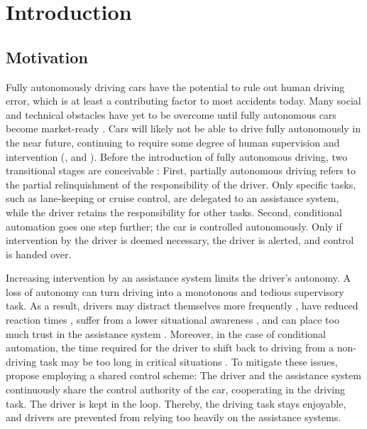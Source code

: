 \chapter{Introduction}
\label{sec:intro}

\section{Motivation}

Fully autonomously driving cars have the potential to rule out human driving error, which is at least a contributing factor to most accidents today. Many social and technical obstacles have yet to be overcome until fully autonomous cars become market-ready \parencite{autonomous_driving_book}. Cars will likely not be able to drive fully autonomously in the near future, continuing to require some degree of human supervision and intervention (\cite{human-needed}, and \cite{human-needed-2}). Before the introduction of fully autonomous driving, two transitional stages are conceivable \parencite{shared_control}: First, partially autonomous driving refers to the partial relinquishment of the responsibility of the driver. Only specific tasks, such as lane-keeping or cruise control, are delegated to an assistance system, while the driver retains the responsibility for other tasks. Second, conditional automation goes one step further; the car is controlled autonomously. Only if intervention by the driver is deemed necessary, the driver is alerted, and control is handed over. 

Increasing intervention by an assistance system limits the driver's autonomy. A loss of autonomy can turn driving into a monotonous and tedious supervisory task. As a result, drivers may distract themselves more frequently \parencite{driver-distraction}, have reduced reaction times \parencite{reaction-time}, suffer from a lower situational awareness \parencite{situational-awareness}, and can place too much trust in the assistance system \parencite{over-trust}. Moreover, in the case of conditional automation, the time required for the driver to shift back to driving from a non-driving task may be too long in critical situations \parencite{takeover-time}. To mitigate these issues, \cite{shared-control-haptics} propose employing a shared control scheme: The driver and the assistance system continuously share the control authority of the car, cooperating in the driving task. The driver is kept in the loop. Thereby, the driving task stays enjoyable, and drivers are prevented from relying too heavily on the assistance systems.

